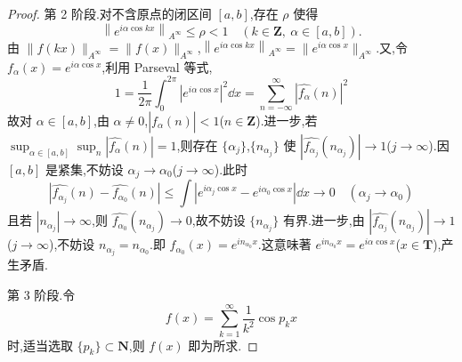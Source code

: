 \begin{proof}
第 2 阶段.对不含原点的闭区间 $[a, b]$,存在 $\rho$ 使得
\begin{equation*}
\left\|e^{i\alpha \cos kx}\right\|_{A^{\infty}} \leq \rho < 1 \quad (k \in \mathbf{Z},\ \alpha \in [a, b]).
\end{equation*}
由 $\|f(kx)\|_{A^{\infty}} = \|f(x)\|_{A^{\infty}}$,$\left\|e^{i\alpha \cos kx}\right\|_{A^{\infty}} = \|e^{i\alpha \cos x}\|_{A^{\infty}}$.又,令 $f_{\alpha}(x) = e^{i\alpha \cos x}$,利用 Parseval 等式,
\begin{equation*}
1 = \frac{1}{2\pi}\int_{0}^{2\pi}\left|e^{i\alpha \cos x}\right|^{2}\dd x = \sum_{n=-\infty}^{\infty}\left|\widehat{f_{\alpha}}(n)\right|^{2}
\end{equation*}
故对 $\alpha \in [a, b]$,由 $\alpha \neq 0$,$\left|\widehat{f_{\alpha}}(n)\right| < 1$($n \in \mathbf{Z}$).进一步,若 $\sup_{\alpha \in [a, b]}\sup_{n}\left|\widehat{f_{\alpha}}(n)\right| = 1$,则存在 $\{\alpha_{j}\}$,$\{n_{\alpha_{j}}\}$ 使 $\left|\widehat{f_{\alpha_{j}}}(n_{\alpha_{j}})\right| \to 1$($j \to \infty$).因 $[a, b]$ 是紧集,不妨设 $\alpha_{j} \to \alpha_{0}$($j \to \infty$).此时
\begin{equation*}
\left|\widehat{f_{\alpha_{j}}}(n) - \widehat{f_{\alpha_{0}}}(n)\right| \leq \int\left|e^{i\alpha_{j}\cos x} - e^{i\alpha_{0}\cos x}\right|\dd x \to 0 \quad (\alpha_{j} \to \alpha_{0})
\end{equation*}
且若 $|n_{\alpha_{j}}| \to \infty$,则 $\widehat{f_{\alpha_{0}}}(n_{\alpha_{j}}) \to 0$,故不妨设 $\{n_{\alpha_{j}}\}$ 有界.进一步,由 $\left|\widehat{f_{\alpha_{j}}}(n_{\alpha_{j}})\right| \to 1$($j \to \infty$),不妨设 $n_{\alpha_{j}} = n_{\alpha_{0}}$.即 $f_{\alpha_{0}}(x) = e^{in_{\alpha_{0}}x}$.这意味著 $e^{in_{\alpha_{0}}x} = e^{i\alpha\cos x}$($x \in \mathbf{T}$),产生矛盾.

第 3 阶段.令
\begin{equation*}
f(x) = \sum_{k=1}^{\infty}\frac{1}{k^{2}}\cos p_{k}x
\end{equation*}
时,适当选取 $\{p_{k}\} \subset \mathbf{N}$,则 $f(x)$ 即为所求.


\end{proof}
